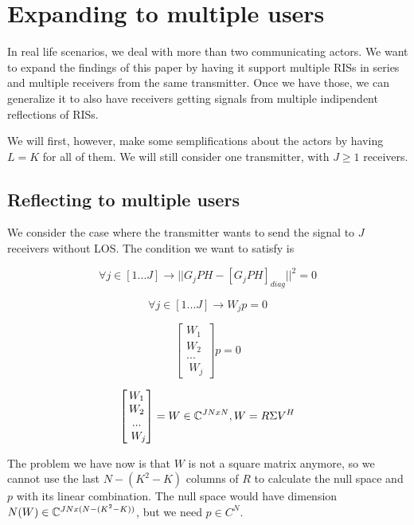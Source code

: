 \section{Expanding to multiple users}

In real life scenarios, we deal with more than two communicating actors. We want to expand the findings of this paper by having it support multiple RISs in series and multiple receivers from the same transmitter. Once we have those, we can generalize it to also have receivers getting signals from multiple indipendent reflections of RISs.

We will first, however, make some semplifications about the actors by having $L = K$ for all of them. We will still consider one transmitter, with $J \ge 1$ receivers.

\subsection{Reflecting to multiple users}

We consider the case where the transmitter wants to send the signal to $J$ receivers without LOS. The condition we want to satisfy is

\begin{equation}
  \forall j \in [1...J] \rightarrow || G_jPH - [G_jPH]_{diag} || ^2 = 0
\end{equation}

\begin{equation}
  \forall j \in [1...J] \rightarrow W_jp = 0
\end{equation}

\begin{equation}
  \begin{bmatrix}
    W_1  \\
    W_ 2 \\
    ...  \\\
    W_j
  \end{bmatrix}
  p = 0
\end{equation}

\begin{equation}
  \begin{bmatrix}
    W_1  \\
    W_ 2 \\
    ...  \\\
    W_j
  \end{bmatrix}
  = W \in \mathbb{C} ^ {JNxN}, W = R \Sigma V^H
\end{equation}

The problem we have now is that $W$ is not a square matrix anymore, so we cannot use the last $N - (K^2 - K)$ columns of $R$ to calculate the null space and $p$ with its linear combination. The null space would have dimension $N(W) \in \mathbb{C}^{JN x (N - (K^2 - K))}$, but we need $p \in C^N$.

